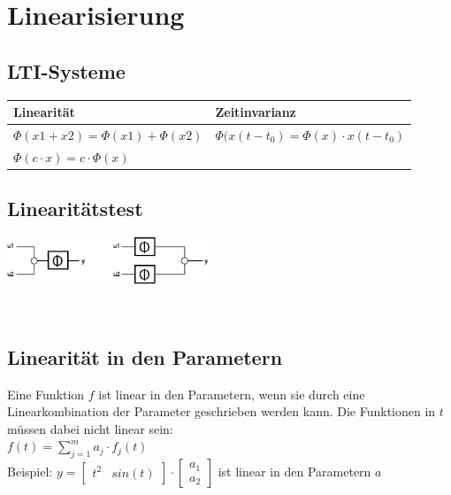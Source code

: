 \section{Linearisierung }
	\begin{minipage}[c]{10cm}
		\subsection{LTI-Systeme }
			\renewcommand{\arraystretch}{1.5}
			\begin{tabular}{|l|l|}
				\hline
				\textbf{Linearität} & \textbf{Zeitinvarianz}\\
				\hline
				$\Phi(x1+x2)=\Phi(x1)+\Phi(x2)$ & $\Phi(x(t-t_0)=\Phi(x)\cdot x(t-t_0)$ \\
				$\Phi(c\cdot x)=c\cdot \Phi(x)$ & \\
				\hline    
			\end{tabular}
			\renewcommand{\arraystretch}{1}
		\end{minipage}
		\begin{minipage}[c]{6cm}
			\subsection{Linearitätstest }
			\includegraphics[width=6cm]{bilder/linearitaetstest}
		\end{minipage} \\
		
		


	\subsection{Linearität in den Parametern}
		Eine Funktion $f$ ist linear in den Parametern, wenn sie durch eine Linearkombination der Parameter geschrieben werden kann. Die Funktionen in $t$ müssen dabei nicht linear sein: \\
		$f(t) = \sum\limits_{j=1}^m a_j \cdot f_j(t)$ \\
		Beispiel: $y = \left[\begin{matrix} t^2 & sin(t) \end{matrix} \right] \cdot \left[\begin{matrix} a_1 \\ a_2 \end{matrix}\right]$ ist linear in den Parametern $a$
		
